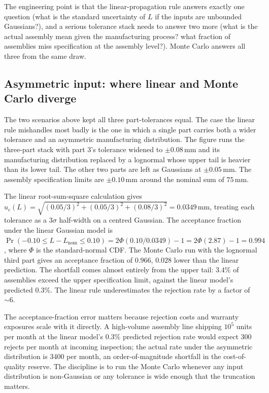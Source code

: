 The engineering point is that the linear-propagation rule answers
exactly one question (what is the standard uncertainty of $L$ if
the inputs are unbounded Gaussians?), and a serious tolerance stack
needs to answer two more (what is the actual assembly mean given
the manufacturing process? what fraction of assemblies miss
specification at the assembly level?). Monte Carlo answers all
three from the same draw.

\subsection{Asymmetric input: where linear and Monte Carlo diverge}

The two scenarios above kept all three part-tolerances equal. The
case the linear rule mishandles most badly is the one in which a
single part carries both a wider tolerance and an asymmetric
manufacturing distribution. The figure
 runs the three-part stack
with part 3's tolerance widened to $\pm 0.08\,\si{\milli\meter}$
and its manufacturing distribution replaced by a lognormal whose
upper tail is heavier than its lower tail. The other two parts are
left as Gaussians at $\pm 0.05\,\si{\milli\meter}$. The assembly
specification limits are $\pm 0.10\,\si{\milli\meter}$ around the
nominal sum of $75\,\si{\milli\meter}$.



The linear root-sum-square calculation gives
$u_{c}(L) = \sqrt{(0.05/3)^{2} + (0.05/3)^{2} + (0.08/3)^{2}}
= 0.0349\,\si{\milli\meter}$, treating each tolerance as a $3\sigma$
half-width on a centred Gaussian. The acceptance fraction under the
linear Gaussian model is
$\Pr(-0.10 \leq L - L_{\text{nom}} \leq 0.10) =
2\Phi(0.10/0.0349) - 1 = 2\Phi(2.87) - 1 = 0.994$,
where $\Phi$ is the standard-normal CDF. The Monte Carlo run with
the lognormal third part gives an acceptance fraction of $0.966$,
$0.028$ lower than the linear prediction. The shortfall comes
almost entirely from the upper tail: $3.4\%$ of assemblies exceed
the upper specification limit, against the linear model's predicted
$0.3\%$. The linear rule underestimates the rejection rate by a
factor of $\sim 6$.

The acceptance-fraction error matters because rejection costs and
warranty exposures scale with it directly. A high-volume assembly
line shipping $10^{5}$ units per month at the linear model's $0.3\%$
predicted rejection rate would expect 300 rejects per month at
incoming inspection; the actual rate under the asymmetric
distribution is 3400 per month, an order-of-magnitude shortfall in
the cost-of-quality reserve. The discipline is to run the Monte
Carlo whenever any input distribution is non-Gaussian or any
tolerance is wide enough that the truncation matters.

